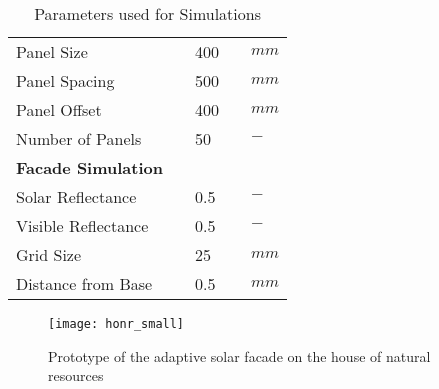 \begin{table}[h!]
\begin{center}
\begin{tabular}{lllll}
		    Panel Size          		&& 400     		&& $mm$    \\
		    Panel Spacing          		&& 500     		&& $mm$    \\
		    Panel Offset          		&& 400     		&& $mm$    \\
		    Number of Panels          	&& 50     		&& $-$    \\\hline
		    \bf Facade Simulation 		&& ~     		&& ~    \\ \hline
		    Solar Reflectance\footnotemark[3]      									&& 0.5     		&& $-$    \\
		    Visible Reflectance\footnotemark[3]
		    				    		&& 0.5     		&& $-$    \\
		    Grid Size      	    		&& 25     		&& $mm$    \\
		    Distance from Base\footnotemark[4]
		    				     		&& 0.5     		&& $mm$    \\
		    \end{tabular}
		    \end{center}
		    \caption{Parameters used for Simulations}
		\end{table}










		\begin{figure}[h] %
			\begin{center}
			\texttt{[image: honr\_small]}
			\caption{Prototype of the adaptive solar facade on the house of natural resources}
			\label{fig:honr}
			\end{center} 
		\end{figure}
